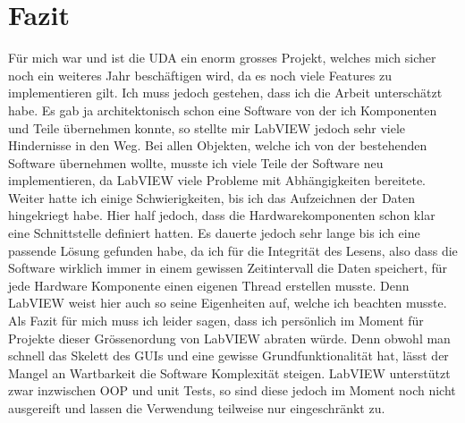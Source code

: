 \documentclass[10pt]{scrartcl}
\begin{document}
\section{Fazit}
Für mich war und ist die UDA ein enorm grosses Projekt, welches mich sicher noch ein weiteres Jahr beschäftigen wird, da es noch viele Features zu implementieren gilt. Ich muss jedoch gestehen, dass ich die Arbeit unterschätzt habe. Es gab ja architektonisch schon eine Software von der ich Komponenten und Teile übernehmen konnte, so stellte mir \gls{LabVIEW} jedoch sehr viele Hindernisse in den Weg. Bei allen Objekten, welche ich von der bestehenden Software übernehmen wollte, musste ich viele Teile der Software neu implementieren, da \gls{LabVIEW} viele Probleme mit Abhängigkeiten bereitete. Weiter hatte ich einige Schwierigkeiten, bis ich das Aufzeichnen der Daten hingekriegt habe. Hier half jedoch, dass die Hardwarekomponenten schon klar eine Schnittstelle definiert hatten. Es dauerte jedoch sehr lange bis ich eine passende Lösung gefunden habe, da ich für die Integrität des Lesens, also dass die Software wirklich immer in einem gewissen Zeitintervall die Daten speichert, für jede Hardware Komponente einen eigenen Thread erstellen musste. Denn \gls{LabVIEW} weist hier auch so seine Eigenheiten auf, welche ich beachten musste. Als Fazit für mich muss ich leider sagen, dass ich persönlich im Moment für Projekte dieser Grössenordung von \gls{LabVIEW} abraten würde. Denn obwohl man schnell das Skelett des GUIs und eine gewisse Grundfunktionalität hat, lässt der Mangel an Wartbarkeit die Software Komplexität steigen. \gls{LabVIEW} unterstützt zwar inzwischen OOP und unit Tests, so sind diese jedoch im Moment noch nicht ausgereift und lassen die Verwendung teilweise nur eingeschränkt zu.
\end{document}
